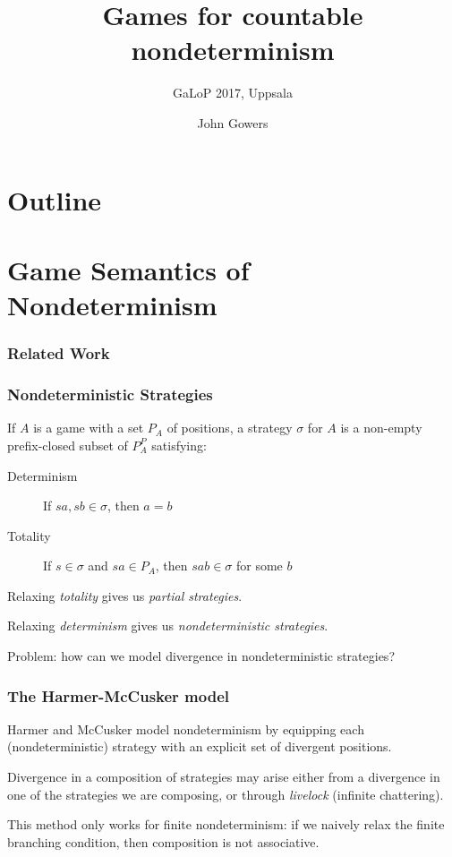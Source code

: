 \documentclass{beamer}
\title{Games for countable nondeterminism}
\subtitle{GaLoP 2017, Uppsala}
\author{John Gowers}
\begin{document}
\begin{frame}
  \titlepage
\end{frame}

\section*{Outline}
\begin{frame}
  \tableofcontents
\end{frame}

\section{Game Semantics of Nondeterminism}

\renewcommand*{\arraystretch}{3}

\begin{frame}[allowframebreaks]
  \frametitle{Related Work}
  \nocite{mcCHFiniteND, RusssThesis, TsukadaSheaves, RoscoeCspInfinite, LevyGsInfinite, LairdOrdinalGames}
  
  
\end{frame}

\begin{frame}
  \frametitle{Nondeterministic Strategies}
  
  \pause
  If $A$ is a game with a set $P_A$ of positions, a strategy $\sigma$ for $A$ is a non-empty prefix-closed subset of $P_A^P$ satisfying:
  \begin{description}
    \item[Determinism] If $sa,sb\in\sigma$, then $a=b$
    \item[Totality] If $s\in\sigma$ and $sa\in P_A$, then $sab\in\sigma$ for some $b$
  \end{description}
  \pause
  Relaxing \emph{totality} gives us \emph{partial strategies}.
  \pause

  Relaxing \emph{determinism} gives us \emph{nondeterministic strategies}.
  \pause

  Problem: how can we model divergence in nondeterministic strategies?
\end{frame}

\begin{frame}
  \frametitle{The Harmer-McCusker model}
  \pause

  Harmer and McCusker model nondeterminism by equipping each (nondeterministic) strategy with an explicit set of divergent positions.  
  \pause

  Divergence in a composition of strategies may arise either from a divergence in one of the strategies we are composing, or through \emph{livelock} (infinite chattering).  
  \pause

  This method only works for finite nondeterminism: if we naively relax the finite branching condition, then composition is not associative.  
\end{frame}
\end{document}
